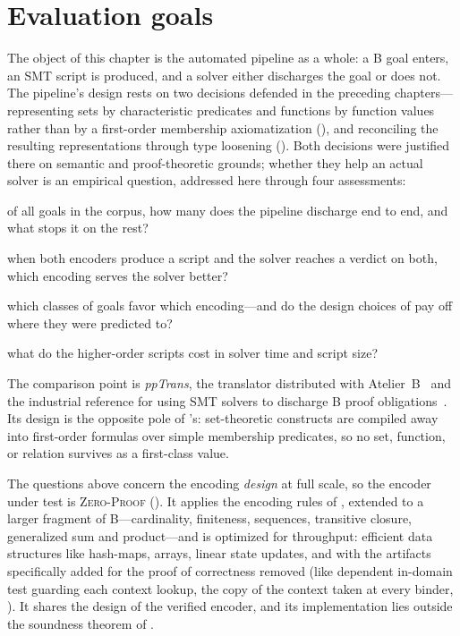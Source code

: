 \section{Evaluation goals}
\label{sec:evaluation-goals}

The object of this chapter is the automated pipeline as a whole: a B goal enters, an SMT script is produced, and a solver either discharges the goal or does not.
The pipeline's design rests on two decisions defended in the preceding chapters---representing sets by characteristic predicates and functions by function values rather than by a first-order membership axiomatization (), and reconciling the resulting representations through type loosening ().
Both decisions were justified there on semantic and proof-theoretic grounds; whether they help an actual solver is an empirical question, addressed here through four assessments:

\begin{description}[font=\normalfont\emph]
  \item[Effectiveness:] of all goals in the corpus, how many does the pipeline discharge end to end, and what stops it on the rest?
  \item[Quality:] when both encoders produce a script and the solver reaches a verdict on both, which encoding serves the solver better?
  \item[Structure:] which classes of goals favor which encoding---and do the design choices of  pay off where they were predicted to?
  \item[Cost:] what do the higher-order scripts cost in solver time and script size?
\end{description}

The comparison point is \emph{ppTrans}, the translator distributed with Atelier~B~\cite{lecomte2024proving} and the industrial reference for using SMT solvers to discharge B proof obligations~\cite{deharbe2014integrating}.
Its design is the opposite pole of \beer's: set-theoretic constructs are compiled away into first-order formulas over simple membership predicates, so no set, function, or relation survives as a first-class value.

The questions above concern the encoding \emph{design} at full scale, so the encoder under test is \textsc{Zero-Proof} \beer{} ().
It applies the encoding rules of , extended to a larger fragment of B---cardinality, finiteness, sequences, transitive closure, generalized sum and product---and is optimized for throughput: efficient data structures like hash-maps, arrays, linear state updates, and with the artifacts specifically added for the proof of correctness removed (like dependent in-domain test guarding each context lookup, the copy of the context taken at every binder, \etc).
It shares the design of the verified encoder, and its implementation lies outside the soundness theorem of .
